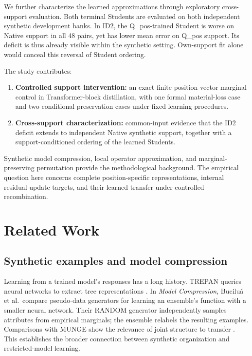We further characterize the learned approximations through exploratory cross-support evaluation. Both terminal Students are evaluated on both independent synthetic development banks. In ID2, the Q\_pos-trained Student is worse on Native support in all 48 pairs, yet has lower mean error on Q\_pos support. Its deficit is thus already visible within the synthetic setting. Own-support fit alone would conceal this reversal of Student ordering.

The study contributes:

\begin{enumerate}
\def\labelenumi{\arabic{enumi}.}
\tightlist
\item
  \textbf{Controlled support intervention:} an exact finite position-vector marginal control in Transformer-block distillation, with one formal material-loss case and two conditional preservation cases under fixed learning procedures.
\item
  \textbf{Cross-support characterization:} common-input evidence that the ID2 deficit extends to independent Native synthetic support, together with a support-conditioned ordering of the learned Students.
\end{enumerate}

Synthetic model compression, local operator approximation, and marginal-preserving permutation provide the methodological background. The empirical question here concerns complete position-specific representations, internal residual-update targets, and their learned transfer under controlled recombination.

\section{Related Work}\label{related-work}

\subsection{Synthetic examples and model compression}\label{synthetic-examples-and-model-compression}

Learning from a trained model's responses has a long history. TREPAN queries neural networks to extract tree representations \citep{craven1995trepan}. In \emph{Model Compression}, Bucilu\v{a} et al.~compare pseudo-data generators for learning an ensemble's function with a smaller neural network. Their RANDOM generator independently samples attributes from empirical marginals; the ensemble relabels the resulting examples. Comparisons with MUNGE show the relevance of joint structure to transfer \citep{bucila2006compression}. This establishes the broader connection between synthetic organization and restricted-model learning.

